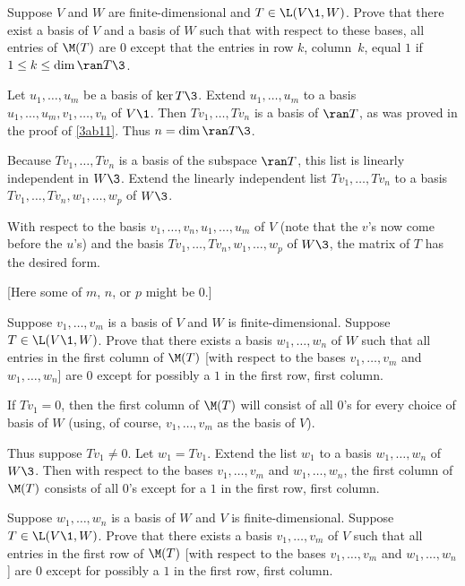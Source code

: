 \exercise
Suppose $V$ and $W$ are finite-dimensional and $T \in \L(V\1, W)$. Prove that there exist a basis of $V$ and a basis of $W$ such that with respect to these bases, all entries of $\M(T)$ are $0$ except that the entries in row $k$, column~$k$, equal $1$ if $1 \le k \le \dim \ran T\3$. \label{zeroonematrix}

\begin{Solution}
Let $u_1, \dots, u_m$ be a basis of $\ker T\3$. Extend $u_1, \dots, u_m$ to a basis $u_1, \dots, u_m, v_1, \dots, v_n$ of $V\1$. Then $Tv_1, \dots, Tv_n$ is a basis of $\ran T$, as was proved in the proof of \ref{3ab11}. Thus $n = \dim \ran T\3$.

Because $Tv_1, \dots, Tv_n$ is a basis of the subspace $\ran T$, this list is linearly independent in $W\3$. Extend the linearly independent list $Tv_1, \dots, Tv_n$ to a basis $Tv_1, \dots, Tv_n, w_1, \dots, w_p$ of $W\3$.

With respect to the basis $v_1, \dots, v_n, u_1, \dots, u_m$ of $V$ (note that the $v$'s now come before the $u$'s) and the basis $Tv_1, \dots, Tv_n, w_1, \dots, w_p$ of $W\3$, the matrix of $T$ has the desired form.

[Here some of $m$, $n$, or $p$ might be $0$.]
\end{Solution}

\exercise
Suppose $v_1, \dots, v_m$ is a basis of $V$ and $W$ is finite-dimensional. Suppose $T \in \L(V\1, W)$. Prove that there exists a basis $w_1, \dots, w_n$ of $W$ such that all entries in the first column of $\M(T)$ [with respect to the bases $v_1, \dots, v_m$ and $w_1, \dots, w_n$] are $0$ except for possibly a $1$ in the first row, first column.

\begin{Solution}
If $Tv_1 = 0$, then the first column of $\M(T)$ will consist of all $0$'s for every choice of basis of $W$ (using, of course, $v_1, \dots, v_m$ as the basis of $V$).

Thus suppose $Tv_1 \ne 0$. Let $w_1 = Tv_1$. Extend the list $w_1$ to a basis $w_1, \dots, w_n$ of $W\3$. Then with
respect to the bases $v_1, \dots, v_m$ and $w_1, \dots, w_n$, the first column of $\M(T)$ consists of all $0$'s except for a $1$ in the first row, first column.
\end{Solution}

\exercise
Suppose $w_1, \dots, w_n$ is a basis of $W$ and $V$ is finite-dimensional. Suppose $T \in \L(V\1, W)$. Prove that there exists a basis $v_1, \dots, v_m$ of $V$ such that all entries in the first row of $\M(T)$ [with respect to the bases $v_1, \dots, v_m$ and $w_1, \dots, w_n$] are $0$ except for possibly a $1$ in the first row, first column.

